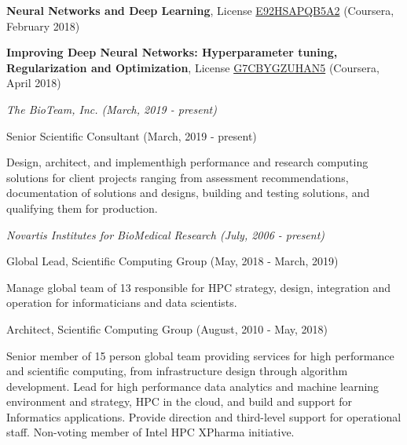 \documentclass[11pt,article,oneside]{memoir}
\begin{document}
\ind \textbf{Neural Networks and Deep Learning}, License \href{https://www.coursera.org/account/accomplishments/verify/E92HSAPQB5A2}{E92HSAPQB5A2} (Coursera, February 2018)

\ind \textbf{Improving Deep Neural Networks: Hyperparameter tuning, Regularization and Optimization}, License \href{Improving Deep Neural Networks: Hyperparameter tuning, Regularization and Optimization}{G7CBYGZUHAN5} (Coursera, April 2018)
\bigskip

\medskip
\noindent\emph{The BioTeam, Inc. (March, 2019 - present) \vspace{0.01in}}

\ind \footnotesize Senior Scientific Consultant (March, 2019 - present)

\ind \hspace{0.35in} \footnotesize Design, architect, and implementhigh performance and research computing solutions for client projects ranging from assessment recommendations, documentation of solutions and designs, building and testing solutions, and qualifying them for production.

\vspace{-0.075in}

\normalsize

\bigskip
\noindent\emph{Novartis Institutes for BioMedical Research (July, 2006 - present) \vspace{0.01in}}

\ind \footnotesize Global Lead, Scientific Computing Group (May, 2018 - March, 2019)

\ind \hspace{0.35in} \footnotesize Manage global team of 13 responsible for HPC strategy, design, integration and operation for informaticians and data scientists.

\medskip
\ind \footnotesize Architect, Scientific Computing Group (August, 2010 - May, 2018)


\ind \hspace{0.35in} \footnotesize Senior member of 15 person global team providing services for high performance and scientific computing, from infrastructure design through algorithm development. Lead for high performance data analytics and machine learning environment and strategy, HPC in the cloud, and build and support for Informatics applications. Provide direction and third-level support for operational staff. Non-voting member of Intel HPC XPharma initiative.
\end{document}
